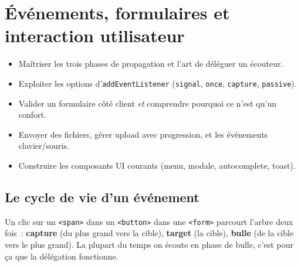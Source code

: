 \chapter{\'Ev\'enements, formulaires et interaction utilisateur}
\label{ch-js-events}

\begin{objectif}
\begin{itemize}
  \item Ma\^itriser les trois phases de propagation et l'art de d\'el\'eguer un \'ecouteur.
  \item Exploiter les options d'\texttt{addEventListener} (\texttt{signal}, \texttt{once},
        \texttt{capture}, \texttt{passive}).
  \item Valider un formulaire c\^ot\'e client \emph{et} comprendre pourquoi ce n'est qu'un confort.
  \item Envoyer des fichiers, g\'erer upload avec progression, et les \'ev\'enements clavier/souris.
  \item Construire les composants UI courants (menu, modale, autocomplete, toast).
\end{itemize}
\end{objectif}

\section{Le cycle de vie d'un \'ev\'enement}

Un clic sur un \verb|<span>| dans un \verb|<button>| dans une \verb|<form>| parcourt l'arbre
deux fois~: \textbf{capture} (du plus grand vers la cible), \textbf{target} (la cible),
\textbf{bulle} (de la cible vers le plus grand). La plupart du temps on \'ecoute en phase de
bulle, c'est pour \c{c}a que la d\'el\'egation fonctionne.

